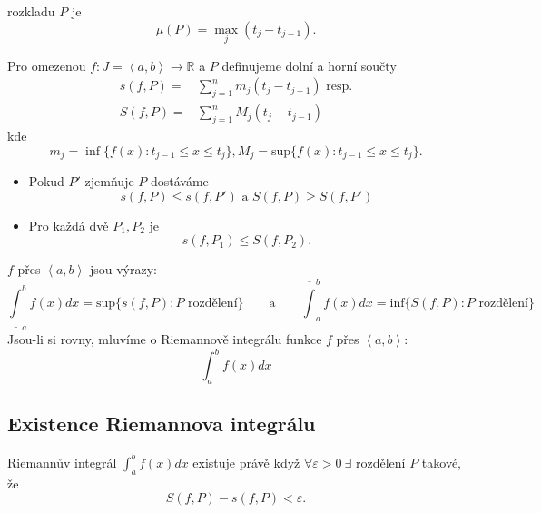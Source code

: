 \documentclass[../main.tex]{subfiles}
\begin{document}
\begin{definitionnodot}[Jemnost]
	rozkladu $P$ je $$\mu(P) = \max_j(t_j-t_{j-1}).$$
\end{definitionnodot}

\begin{definition}
	Pro omezenou $f:J=\left<a,b\right> \rightarrow \mathbb{R} $ a $P$ definujeme dolní a horní součty
	\begin{align*}
	    s(f,P) = & \sum^n_{j=1} m_j(t_j-t_{j-1}) \text{ resp.}\\
	    S(f,P) = & \sum^n_{j=1} M_j(t_j-t_{j-1})
	\end{align*}
	kde
	\[m_j = \inf\{f(x) : t_{j-1} \leq x \leq t_j\}, M_j = \text{sup}\{f(x) : t_{j-1} \leq x \leq t_j\}.\]
\end{definition}

\begin{lemma}
	\hfill
	\begin{itemize}
			\item Pokud $P'$ zjemňuje $P$ dostáváme
			\[s(f,P) \leq s(f,P') \text{ a } S(f,P) \geq S(f,P')\]
			\item Pro každá dvě $P_1, P_2$ je 
			\[s(f,P_1) \leq S(f, P_2).\]
	\end{itemize}
\end{lemma}

\begin{definitionnodot}
	$f$ přes $\left<a,b\right>$ jsou výrazy:
	$$\underline{\int}^b_{ a} f(x)dx = \text{sup}\{s(f,P) : P \text{ rozdělení}\} \qquad \text{a}\qquad
	\overline{\int}^b_{ a} f(x)dx = \text{inf}\{S(f,P) : P \text{ rozdělení}\}$$ 
	Jsou-li si rovny, mluvíme o Riemannově integrálu funkce $f$ přes $\left<a,b\right>$:
	\[\int^b_a f(x) dx\]
\end{definitionnodot}

\subsection{Existence Riemannova integrálu}
\begin{theorem}
	Riemannův integrál $\int^b_a f(x) dx$ existuje právě když $\forall \varepsilon > 0\ \exists$ rozdělení $P$ takové, že
	\[S(f,P) - s(f,P) < \varepsilon.\]
\end{theorem}
\end{document}

